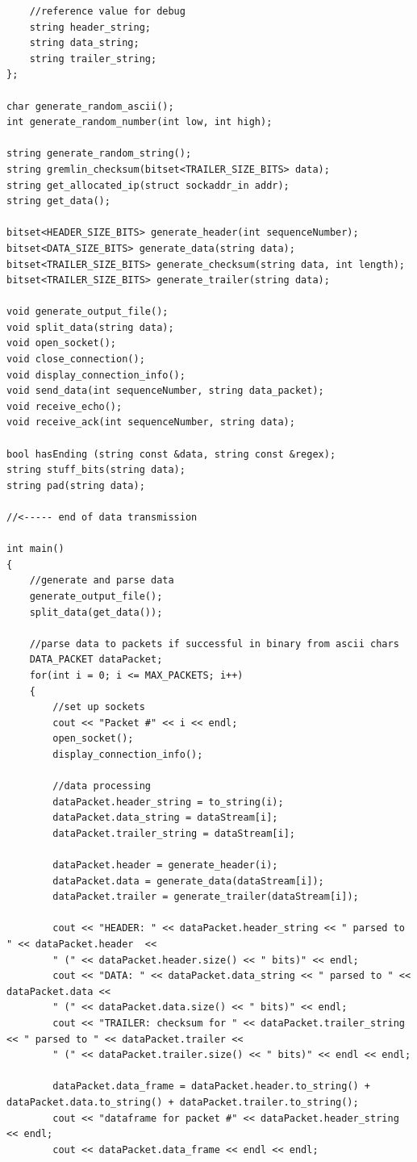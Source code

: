 \documentclass[12pt]{article}
\begin{document}
\begin{lstlisting}
	//reference value for debug
	string header_string;
	string data_string;
	string trailer_string;
};

char generate_random_ascii();
int generate_random_number(int low, int high);

string generate_random_string();
string gremlin_checksum(bitset<TRAILER_SIZE_BITS> data);
string get_allocated_ip(struct sockaddr_in addr);
string get_data();

bitset<HEADER_SIZE_BITS> generate_header(int sequenceNumber);
bitset<DATA_SIZE_BITS> generate_data(string data);
bitset<TRAILER_SIZE_BITS> generate_checksum(string data, int length);
bitset<TRAILER_SIZE_BITS> generate_trailer(string data);

void generate_output_file();
void split_data(string data);
void open_socket();
void close_connection();
void display_connection_info();
void send_data(int sequenceNumber, string data_packet);
void receive_echo();
void receive_ack(int sequenceNumber, string data);

bool hasEnding (string const &data, string const &regex);
string stuff_bits(string data);
string pad(string data);

//<----- end of data transmission 

int main()
{
	//generate and parse data
	generate_output_file();
	split_data(get_data());

	//parse data to packets if successful in binary from ascii chars
	DATA_PACKET dataPacket;
	for(int i = 0; i <= MAX_PACKETS; i++)
	{
		//set up sockets
		cout << "Packet #" << i << endl;
		open_socket();
		display_connection_info();

		//data processing
		dataPacket.header_string = to_string(i);
		dataPacket.data_string = dataStream[i];
		dataPacket.trailer_string = dataStream[i];

		dataPacket.header = generate_header(i);
		dataPacket.data = generate_data(dataStream[i]);
		dataPacket.trailer = generate_trailer(dataStream[i]);

		cout << "HEADER: " << dataPacket.header_string << " parsed to " << dataPacket.header  << 
		" (" << dataPacket.header.size() << " bits)" << endl;
		cout << "DATA: " << dataPacket.data_string << " parsed to " << dataPacket.data << 
		" (" << dataPacket.data.size() << " bits)" << endl;
		cout << "TRAILER: checksum for " << dataPacket.trailer_string << " parsed to " << dataPacket.trailer << 
		" (" << dataPacket.trailer.size() << " bits)" << endl << endl; 
		
		dataPacket.data_frame = dataPacket.header.to_string() + dataPacket.data.to_string() + dataPacket.trailer.to_string();
		cout << "dataframe for packet #" << dataPacket.header_string << endl;
		cout << dataPacket.data_frame << endl << endl;


\end{lstlisting}
\end{document}

